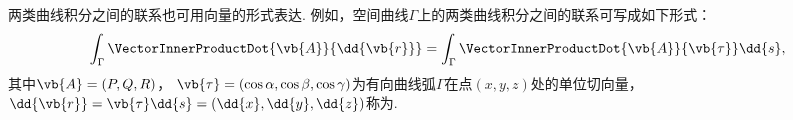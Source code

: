 两类曲线积分之间的联系也可用向量的形式表达.
例如，空间曲线\(\Gamma\)上的两类曲线积分之间的联系可写成如下形式：
\begin{equation}\label{equation:线积分与面积分.空间曲线上两类曲线积分之间的联系的向量形式}
	\int_\Gamma \VectorInnerProductDot{\vb{A}}{\dd{\vb{r}}}
	= \int_\Gamma \VectorInnerProductDot{\vb{A}}{\vb{\tau}} \dd{s},
\end{equation}
其中\(\vb{A}=(P,Q,R)\)，
\(\vb{\tau}=(\cos\alpha,\cos\beta,\cos\gamma)\)为有向曲线弧\(\Gamma\)在点\((x,y,z)\)处的单位切向量，
\(\dd{\vb{r}}
=\vb{\tau}\dd{s}
=(\dd{x},\dd{y},\dd{z})\)称为.

